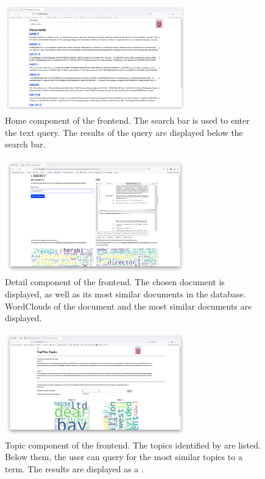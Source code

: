\begin{figure}[htp] %
    \centering
    \includegraphics[width=0.7\textwidth]{images/UI/Home_component.png}
    \caption{Home component of the frontend.
    The search bar is used to enter the text query.
    The results of the query are displayed below the search bar.
    }
    \label{fig:home_comp}
\end{figure}


\begin{figure}[htp] %
    \centering
    \includegraphics[width=0.7\textwidth]{images/UI/Home_detail.png}
    \caption{Detail component of the frontend.
    The chosen document is displayed, as well as its most similar documents in the database.
    WordClouds of the document and the most similar documents are displayed.
    }
    \label{fig:detail_comp}
\end{figure}


\begin{figure}[htp] %
    \centering
    \includegraphics[width=0.7\textwidth]{images/UI/Top2Vec_Topics.png}
    \caption{Topic component of the frontend.
    The topics identified by \topTwovec{} are listed.
    Below them, the user can query for the most similar topics to a term.
    The results are displayed as a \wordcloud{}.
    }
    \label{fig:top2vec_topic_comp}
\end{figure}


